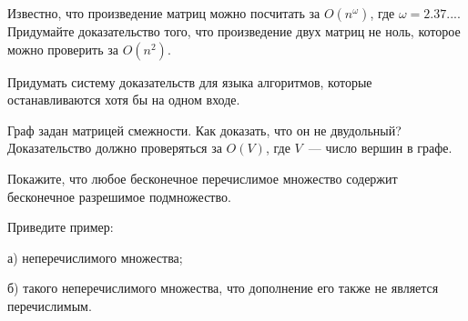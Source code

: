 \setcounter{curtask}{1}



\begin{frame}


\begin{task}
    Известно, что произведение матриц можно посчитать за $O(n^{\omega})$, где $\omega
    =  2.37...$. Придумайте доказательство того, что произведение двух матриц не
    ноль, которое можно проверить за $O(n^2)$.
\end{task}

\begin{task}
	Придумать систему доказательств для языка алгоритмов, которые останавливаются
    хотя бы на одном входе.
\end{task}

\begin{task}
    Граф задан матрицей смежности. Как доказать, что он не двудольный? Доказательство
    должно проверяться за $O(V)$, где $V$~--- число вершин в графе.
\end{task}

\begin{task}
	Покажите, что любое бесконечное перечислимое множество содержит бесконечное
    разрешимое подмножество.    
\end{task}

\begin{task}
    Приведите пример:
    
    а) неперечислимого множества;

    б) такого неперечислимого множества, что дополнение его также не является
    перечислимым.
\end{task}

\end{frame}